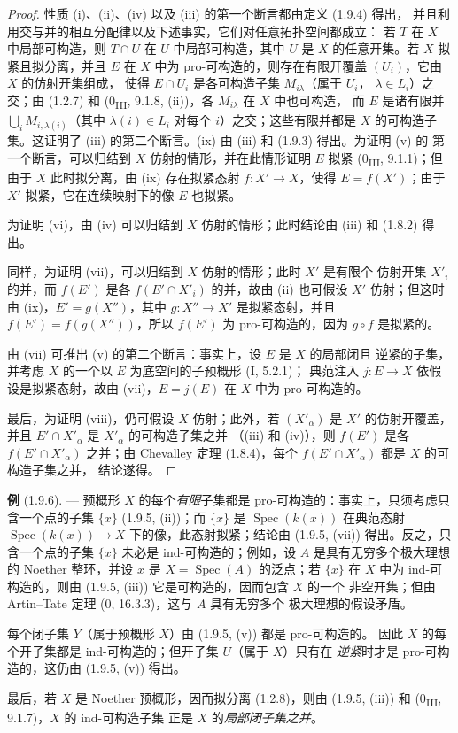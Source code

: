 \begin{proof}
性质 (i)、(ii)、(iv) 以及 (iii) 的第一个断言都由定义 (1.9.4) 得出，
并且利用交与并的相互分配律以及下述事实，它们对任意拓扑空间都成立：
若 $T$ 在 $X$ 中局部可构造，则 $T\cap U$ 在 $U$ 中局部可构造，其中
$U$ 是 $X$ 的任意开集。若 $X$ 拟紧且拟分离，并且 $E$ 在 $X$ 中为
pro-可构造的，则存在有限开覆盖 $(U_i)$，它由 $X$ 的仿射开集组成，
使得 $E\cap U_i$ 是各可构造子集 $M_{i\lambda}$（属于 $U_i$，
$\lambda\in L_i$）之交；由 (1.2.7) 和
(0\textsubscript{III}, 9.1.8, (ii))，各 $M_{i\lambda}$ 在 $X$ 中也可构造，
而 $E$ 是诸有限并 $\bigcup_iM_{i,\lambda(i)}$（其中
$\lambda(i)\in L_i$ 对每个 $i$）之交；这些有限并都是 $X$ 的可构造子集。这证明了
(iii) 的第二个断言。(ix) 由 (iii) 和 (1.9.3) 得出。为证明 (v) 的
第一个断言，可以归结到 $X$ 仿射的情形，并在此情形证明 $E$ 拟紧
(0\textsubscript{III}, 9.1.1)；但由于 $X$ 此时拟分离，由 (ix) 存在拟紧态射
$f:X'\to X$，使得 $E=f(X')$；由于 $X'$ 拟紧，它在连续映射下的像
$E$ 也拟紧。

为证明 (vi)，由 (iv) 可以归结到 $X$ 仿射的情形；此时结论由 (iii) 和
(1.8.2) 得出。


同样，为证明 (vii)，可以归结到 $X$ 仿射的情形；此时 $X'$ 是有限个
仿射开集 $X'_i$ 的并，而 $f(E')$ 是各 $f(E'\cap X'_i)$ 的并，故由 (ii)
也可假设 $X'$ 仿射；但这时由 (ix)，$E'=g(X'')$，其中
$g:X''\to X'$ 是拟紧态射，并且 $f(E')=f(g(X''))$，所以 $f(E')$ 为
pro-可构造的，因为 $g\circ f$ 是拟紧的。

由 (vii) 可推出 (v) 的第二个断言：事实上，设 $E$ 是 $X$ 的局部闭且
逆紧的子集，并考虑 $X$ 的一个以 $E$ 为底空间的子预概形 (I, 5.2.1)；
典范注入 $j:E\to X$ 依假设是拟紧态射，故由 (vii)，$E=j(E)$ 在
$X$ 中为 pro-可构造的。

最后，为证明 (viii)，仍可假设 $X$ 仿射；此外，若 $(X'_\alpha)$ 是
$X'$ 的仿射开覆盖，并且 $E'\cap X'_\alpha$ 是 $X'_\alpha$ 的可构造子集之并
（(iii) 和 (iv)），则 $f(E')$ 是各 $f(E'\cap X'_\alpha)$ 之并；由 Chevalley
定理 (1.8.4)，每个 $f(E'\cap X'_\alpha)$ 都是 $X$ 的可构造子集之并，
结论遂得。
\end{proof}

\begin{env}[1.9.6]
\label{IV.1.9.6-fr}
\textbf{例} (1.9.6). --- 预概形 $X$ 的每个\emph{有限}子集都是
pro-可构造的：事实上，只须考虑只含一个点的子集 $\{x\}$
(1.9.5, (ii))；而 $\{x\}$ 是 $\operatorname{Spec}(k(x))$ 在典范态射
$\operatorname{Spec}(k(x))\to X$ 下的像，此态射拟紧；结论由
(1.9.5, (vii)) 得出。反之，只含一个点的子集 $\{x\}$ 未必是
ind-可构造的；例如，设 $A$ 是具有无穷多个极大理想的 Noether 整环，并设
$x$ 是 $X=\operatorname{Spec}(A)$ 的泛点；若 $\{x\}$ 在 $X$ 中为
ind-可构造的，则由 (1.9.5, (iii)) 它是可构造的，因而包含 $X$ 的一个
非空开集；但由 Artin--Tate 定理 (0, 16.3.3)，这与 $A$ 具有无穷多个
极大理想的假设矛盾。

每个闭子集 $Y$（属于预概形 $X$）由 (1.9.5, (v)) 都是 pro-可构造的。
因此 $X$ 的每个开子集都是 ind-可构造的；但开子集 $U$（属于 $X$）只有在
\emph{逆紧}时才是 pro-可构造的，这仍由 (1.9.5, (v)) 得出。

最后，若 $X$ 是 Noether 预概形，因而拟分离 (1.2.8)，则由
(1.9.5, (iii)) 和 (0\textsubscript{III}, 9.1.7)，$X$ 的 ind-可构造子集
正是 $X$ 的\emph{局部闭子集之并}。
\end{env}

